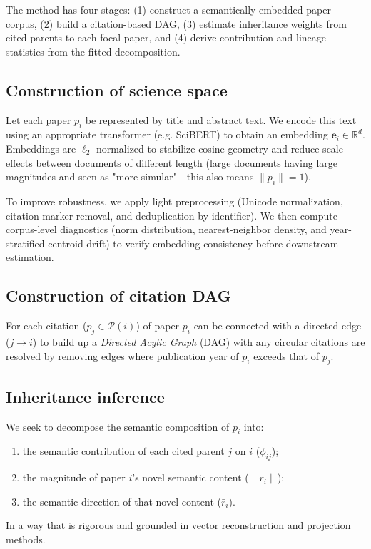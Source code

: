 The method has four stages: (1) construct a semantically embedded paper corpus, (2) build a citation-based DAG, (3) estimate inheritance weights from cited parents to each focal paper, and (4) derive contribution and lineage statistics from the fitted decomposition.

\subsection{Construction of science space}
Let each paper $p_i$ be represented by title and abstract text. We encode this text using an appropriate transformer (e.g.  SciBERT) to obtain an embedding $\mathbf{e}_i \in \mathbb{R}^d$. Embeddings are $\ell_2$-normalized to stabilize cosine geometry and reduce scale effects between documents of different length (large documents having large magnitudes and seen as "more simular" - this also means $\|p_i\|=1$).

To improve robustness, we apply light preprocessing (Unicode normalization, citation-marker removal, and deduplication by identifier). We then compute corpus-level diagnostics (norm distribution, nearest-neighbor density, and year-stratified centroid drift) to verify embedding consistency before downstream estimation. %

\subsection{Construction of citation DAG}
For each citation ($p_j\in \mathcal{P}(i)$) of paper $p_i$ can be connected with a directed edge ($j\to i$) to build up a \textit{Directed Acylic Graph} (DAG) with any circular citations are resolved by removing edges where publication year of $p_i$ exceeds that of $p_j$.

\subsection{Inheritance inference}

We seek to decompose the semantic composition of $p_i$ into:
\begin{enumerate}
    \item the semantic contribution of each cited parent $j$ on $i$ ($\phi_{ij}$);
    \item the magnitude of paper $i$'s novel semantic content ($\|r_i\|$);
    \item the semantic direction of that novel content ($\bar{r}_i$).
\end{enumerate}
In a way that is rigorous and grounded in vector reconstruction and projection methods.

